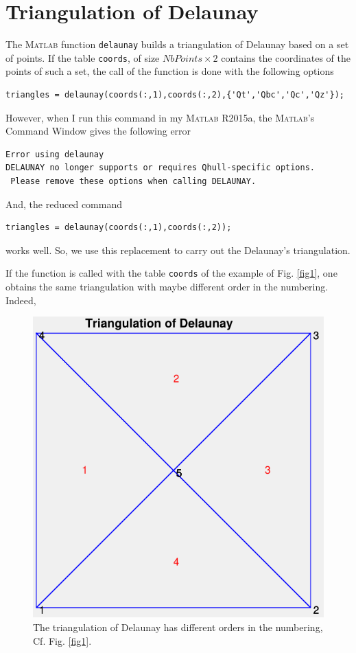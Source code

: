 \documentclass[11pt,a4paper,center,notitlepage]{article}
\numberwithin{equation}{section}
\begin{document}
\section{Triangulation of Delaunay}
The \textsc{Matlab} function \texttt{delaunay} builds a triangulation of Delaunay based on a set of points. If the table \texttt{coords}, of size $NbPoints \times 2$ contains the coordinates of the points of such a set, the call of the function is done with the following options
\begin{verbatim}
triangles = delaunay(coords(:,1),coords(:,2),{'Qt','Qbc','Qc','Qz'});
\end{verbatim}
However, when I run this command in my \textsc{Matlab} R2015a, the \textsc{Matlab}'s Command Window gives the following error
\begin{verbatim}
Error using delaunay
DELAUNAY no longer supports or requires Qhull-specific options.
 Please remove these options when calling DELAUNAY.
\end{verbatim}
And, the reduced command
\begin{verbatim}
triangles = delaunay(coords(:,1),coords(:,2));
\end{verbatim}
works well. So, we use this replacement to carry out the Delaunay's triangulation.

If the function is called with the table \texttt{coords} of the example of Fig. \ref{fig1}, one obtains the same triangulation with maybe different order in the numbering. Indeed,
\begin{figure}[H]
\centering
\includegraphics[scale=0.6]{8}
\caption{The triangulation of Delaunay has different orders in the numbering, Cf. Fig. \ref{fig1}.}
\label{fig8}
\end{figure}
\end{document}
